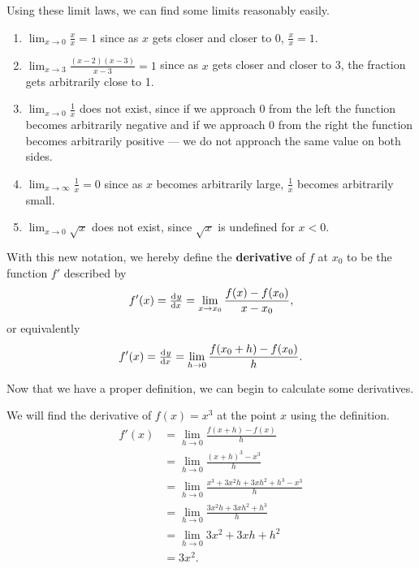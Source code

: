 \begin{exs}
  Using these limit laws, we can find some limits reasonably easily.
  \begin{enumerate}
    \item $ \lim_{x \to 0} \frac{x}{x} = 1 $ since as $ x $ gets closer and closer to $ 0 $, $ \frac{x}{x} = 1 $.
    \item $ \lim_{x \to 3} \frac{(x - 2)(x - 3)}{x - 3} = 1 $ since as $ x $ gets closer and closer to 3, the fraction gets arbitrarily close to 1.
    \item $ \lim_{x \to 0} \frac{1}{x} $ does not exist, since if we approach 0 from the left the function becomes arbitrarily negative
          and if we approach 0 from the right the function becomes arbitrarily positive --- we do not approach the same value on both sides.
    \item $ \lim_{x \to \infty} \frac{1}{x} = 0 $ since as $ x $ becomes arbitrarily large, $ \frac{1}{x} $ becomes arbitrarily small.
    \item $ \lim_{x \to 0} \sqrt{x} $ does not exist, since $ \sqrt{x} $ is undefined for $ x < 0 $.
  \end{enumerate}
\end{exs}

With this new notation, we hereby define the \textbf{derivative} of $ f $ at $ x_0 $ to be the function $ f' $ described by
\begin{displaymath}
  f'(x) = \od{y}{x} = \lim_{x \to x_0} \frac{f(x) - f(x_0)}{x - x_0},
\end{displaymath}
or equivalently
\begin{displaymath}
  f'(x) = \od{y}{x} = \lim_{h \to 0} \frac{f(x_0 + h) - f(x_0)}{h}.
\end{displaymath}

Now that we have a proper definition, we can begin to calculate some derivatives.

\begin{ex}
  We will find the derivative of $ f(x) = x^3 $ at the point $ x $ using the definition.
  \begin{align*}
    f'(x) &= \lim_{h \to 0} \frac{f(x + h) - f(x)}{h}\\
          &= \lim_{h \to 0} \frac{(x + h)^3 - x^3}{h}\\
          &= \lim_{h \to 0} \frac{x^3 + 3x^2h + 3xh^2 + h^3 - x^3}{h}\\
          &= \lim_{h \to 0} \frac{3x^2 h + 3xh^2 + h^3}{h}\\
          &= \lim_{h \to 0} 3x^2 + 3xh + h^2\\
          &= 3x^2.
  \end{align*}
\end{ex}

